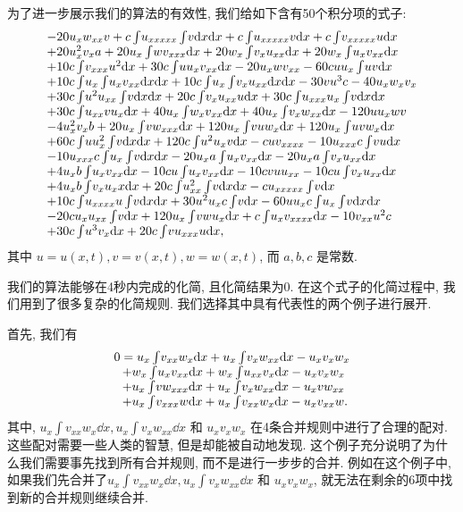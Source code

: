 为了进一步展示我们的算法的有效性, 我们给如下含有50个积分项的式子:
\begin{equation}
\def\arraystretch{1.0}
\begin{array}{l}
-20u_xw_{xx}v
+c\ii{u_{xxxxx}\ii{v}}
+c\ii{u_{xxxxx}v}
+c\ii{v_{xxxxx}u}\\%
+20u_x^2v_xa
+20u_x\ii{wv_{xxx}}
+20w_x\ii{v_xu_{xx}}
+20w_x\ii{u_xv_{xx}}\\%
+10c\ii{v_{xxx}u^2}
+30c\ii{uu_xv_{xx}}
-20u_xwv_{xx}
-60cuu_x\ii{uv}\\%
+10c\ii{u_x\ii{u_xv_{xx}}}
+10c\ii{u_x\ii{v_xu_{xx}}}
-30vu^3c
-40u_xw_xv_x\\%
+30c\ii{u^2u_{xx}\ii{v}}
+20c\ii{v_xu_{xx}u}
+30c\ii{u_{xxx}u_x\ii{v}}\\%
+30c\ii{u_{xx}vu_x}
+40u_x\ii{w_xv_{xx}}
+40u_x\ii{v_xw_{xx}}
-120uu_xwv\\%
-4u_x^2v_xb
+20u_x\ii{vw_{xxx}}
+120u_x\ii{vuw_x}
+120u_x\ii{uvw_x}\\%
+60c\ii{uu_x^2\ii{v}}
+120c\ii{u^2u_xv}
-cuv_{xxxx}
-10u_{xxx}c\ii{vu}\\%
-10u_{xxx}c\ii{u_x\ii{v}}
-20u_xa\ii{u_xv_{xx}}
-20u_xa\ii{v_xu_{xx}}\\%
+4u_xb\ii{u_xv_{xx}}
-10cu\ii{u_xv_{xx}}
-10c v u u_{xx}
-10cu\ii{v_xu_{xx}}\\%
+4u_xb\ii{v_xu_xx}
+20c\ii{u_{xx}^2\ii{v}}
-cu_{xxxxx}\ii{v}\\%
+10c\ii{u_{xxxx}u\ii{v}}
+30u^2u_xc\ii{v}
-60uu_xc\ii{u_x\ii{v}}\\%
-20cu_xu_{xx}\ii{v}
+120u_x\ii{vwu_x}
+c\ii{u_xv_{xxxx}}
-10v_{xx}u^2c\\%
+30c\ii{u^3v_x}
+20c\ii{vu_{xxx}u},\\%
\end{array}
\label{big50}
\end{equation}
其中 $u=u(x,t),v=v(x,t),w=w(x,t)$, 而 $a,b,c$ 是常数. 

我们的算法能够在4秒内完成的化简, 且化简结果为0. 在这个式子的化简过程中, 我们用到了很多复杂的化简规则. 我们选择其中具有代表性的两个例子进行展开. 

首先, 我们有 
\begin{equation}
\def\arraystretch{1.0}
\begin{array}{l}
0=u_x\int\!{v_{xx}w_x\dd x}+u_x\int\!{v_xw_{xx}\dd x}-u_xv_xw_x\\
~~+w_x\int\!{u_xv_{xx}\dd x}+w_x\int\!{u_{xx}v_x\dd x}-u_xv_xw_x\\
~~+u_x\int\!{vw_{xxx}\dd x}+u_x\int\!{v_xw_{xx}\dd x}-u_xvw_{xx}\\
~~+u_x\int\!{v_{xxx}w\dd x}+u_x\int\!{v_{xx}w_x\dd x}-u_xv_{xx}w.
\end{array}
\label{counter_example}
\end{equation}
其中, $u_x\int\!{v_{xx}w_x\dd x},u_x\int\!{v_xw_{xx}\dd x}$ 和 $u_xv_xw_x$ 在4条合并规则中进行了合理的配对. 这些配对需要一些人类的智慧, 但是却能被自动地发现. 这个例子充分说明了为什么我们需要事先找到所有合并规则, 而不是进行一步步的合并. 例如在这个例子中, 如果我们先合并了$u_x\int\!{v_{xx}w_x\dd x},u_x\int\!{v_xw_{xx}\dd x}$ 和 $u_xv_xw_x$, 就无法在剩余的6项中找到新的合并规则继续合并. 

